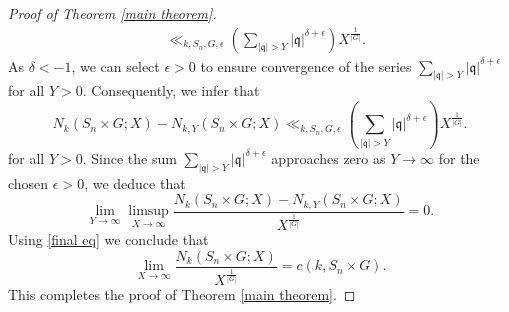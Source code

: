 \documentclass[11pt]{amsart}
\newcommand{\fq}{\mathfrak{q}}
\numberwithin{equation}{section}
\begin{document}
\begin{proof}[Proof of Theorem \ref{main theorem}]
\begin{equation*}
\begin{split}
         &\ll_{k,S_n,G,\epsilon} \left(\sum_{|\fq| > Y}|\fq|^{\delta+\epsilon}\right) X^{\frac{1}{|G|}}.
    \end{split}
\end{equation*}
As $\delta < -1$, we can select $\epsilon > 0$ to ensure convergence of the series $\sum_{|\fq| > Y}|\fq|^{\delta+\epsilon}$ for all $Y > 0$. Consequently, we infer that
\[
 N_{k}(S_n\times G; X)-N_{k, Y}(S_n\times G; X) \ll_{k,S_n, G, \epsilon} \left(\sum_{|\fq| > Y}|\fq|^{\delta+\epsilon}\right)X^{\frac{1}{|G|}}.
\]
for all $Y > 0$. Since the sum $\sum_{|\fq| > Y}|\fq|^{\delta+\epsilon}$ approaches zero as $Y \to \infty$ for the chosen $\epsilon > 0$, we deduce that
\[
\lim_{Y \to \infty}\limsup_{X \to \infty}\frac{N_k(S_n \times G; X)- N_{k,Y}(S_n \times G; X)}{X^{\frac{1}{|G|}}} = 0.
\]
Using \eqref{final eq} we conclude that
\[
\lim_{X\to\infty}\frac{N_k(S_n \times G; X)}{X^{\frac{1}{|G|}}}=c(k, S_n\times G).
\]
This completes the proof of Theorem \ref{main theorem}.
\end{proof}






\end{document}
